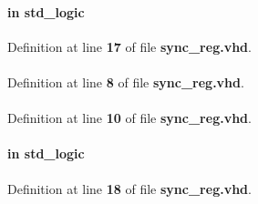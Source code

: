 \paragraph[{clk}]{ {\bfseries \textcolor{keywordflow}{in}\textcolor{vhdlchar}{ }} {\bfseries \textcolor{comment}{std\+\_\+logic}\textcolor{vhdlchar}{ }} \hspace{0.3cm}{\ttfamily [Port]}}\label{classsync__reg_a4a4609c199d30b3adebbeb3a01276ec5}


Definition at line {\bf 17} of file {\bf sync\+\_\+reg.\+vhd}.

\paragraph[{ieee}]{\hspace{0.3cm}{\ttfamily [Library]}}\label{classsync__reg_a0a6af6eef40212dbaf130d57ce711256}


Definition at line {\bf 8} of file {\bf sync\+\_\+reg.\+vhd}.

\paragraph[{numeric\+\_\+std}]{\hspace{0.3cm}{\ttfamily [Package]}}\label{classsync__reg_a2edc34402b573437d5f25fa90ba4013e}


Definition at line {\bf 10} of file {\bf sync\+\_\+reg.\+vhd}.

\paragraph[{reset\+\_\+n}]{ {\bfseries \textcolor{keywordflow}{in}\textcolor{vhdlchar}{ }} {\bfseries \textcolor{comment}{std\+\_\+logic}\textcolor{vhdlchar}{ }} \hspace{0.3cm}{\ttfamily [Port]}}\label{classsync__reg_a446ea52ed8c4a84181a47d9165ce41a5}


Definition at line {\bf 18} of file {\bf sync\+\_\+reg.\+vhd}.

